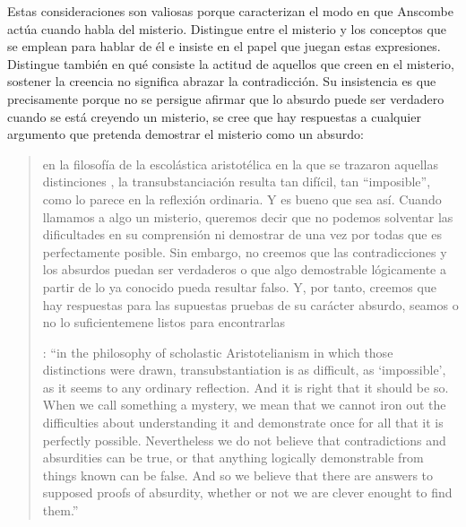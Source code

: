Estas consideraciones son valiosas porque caracterizan el modo en que Anscombe actúa cuando habla del misterio. Distingue entre el misterio y los conceptos que se emplean para hablar de él e insiste en el papel que juegan estas expresiones. Distingue también en qué consiste la actitud de aquellos que creen en el misterio, sostener la creencia no significa abrazar la contradicción. Su insistencia es que precisamente porque no se persigue afirmar que lo absurdo puede ser verdadero cuando se está creyendo un misterio, se cree que hay respuestas a cualquier argumento que pretenda demostrar el misterio como un absurdo: \blockquote[{\cite[109]{anscombe1981erp:ot}}: \enquote{in the philosophy of scholastic Aristotelianism in which those distinctions  were drawn, transubstantiation is as difficult, as `impossible', as it seems to any ordinary reflection. And it is right that it should be so. When we call something a mystery, we mean that we cannot iron out the difficulties about understanding it and demonstrate once for all that it is perfectly possible. Nevertheless we do not believe that contradictions and absurdities can be true, or that anything logically demonstrable from things known can be false. And so we believe that there are answers to supposed proofs of absurdity, whether or not we are clever enought to find them.}]{en la filosofía de la escolástica aristotélica en la que se trazaron aquellas distinciones , la transubstanciación resulta tan difícil, tan ``imposible'', como lo parece en la reflexión ordinaria. Y es bueno que sea así. Cuando llamamos a algo un misterio, queremos decir que no podemos solventar las dificultades en su comprensión ni demostrar de una vez por todas que es perfectamente posible. Sin embargo, no creemos que las contradicciones y los absurdos puedan ser verdaderos o que algo demostrable lógicamente a partir de lo ya conocido pueda resultar falso. Y, por tanto, creemos que hay respuestas para las supuestas pruebas de su carácter absurdo, seamos o no lo suficientemene listos para encontrarlas}.

